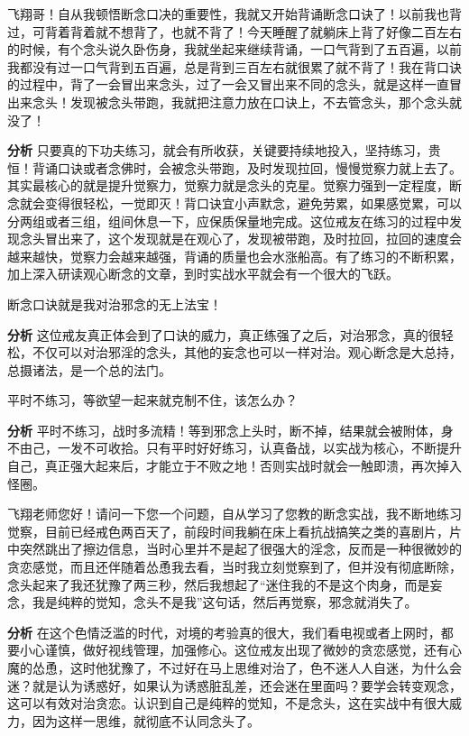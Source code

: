 \begin{case}
    飞翔哥！自从我顿悟断念口决的重要性，我就又开始背诵断念口诀了！以前我也背过，可背着背着就不想背了，也就不背了！今天睡醒了就躺床上背了好像二百左右的时候，有个念头说久卧伤身，我就坐起来继续背诵，一口气背到了五百遍，以前我都没有过一口气背到五百遍，总是背到三百左右就很累了就不背了！我在背口诀的过程中，背了一会冒出来念头，过了一会又冒出来不同的念头，就是这样一直冒出来念头！发现被念头带跑，我就把注意力放在口诀上，不去管念头，那个念头就没了！

    \textbf{分析} 只要真的下功夫练习，就会有所收获，关键要持续地投入，坚持练习，贵恒！背诵口诀或者念佛时，会被念头带跑，及时发现拉回，慢慢觉察力就上去了。其实最核心的就是提升觉察力，觉察力就是念头的克星。觉察力强到一定程度，断念就会变得很轻松，一觉即灭！背口诀宜小声默念，避免劳累，如果感觉累，可以分两组或者三组，组间休息一下，应保质保量地完成。这位戒友在练习的过程中发现念头冒出来了，这个发现就是在观心了，发现被带跑，及时拉回，拉回的速度会越来越快，觉察力会越来越强，背诵的质量也会水涨船高。有了练习的不断积累，加上深入研读观心断念的文章，到时实战水平就会有一个很大的飞跃。
\end{case}

\begin{case}
    断念口诀就是我对治邪念的无上法宝！

    \textbf{分析} 这位戒友真正体会到了口诀的威力，真正练强了之后，对治邪念，真的很轻松，不仅可以对治邪淫的念头，其他的妄念也可以一样对治。观心断念是大总持，总摄诸法，是一个总的法门。
\end{case}

\begin{case}
    平时不练习，等欲望一起来就克制不住，该怎么办？

    \textbf{分析} 平时不练习，战时多流精！等到邪念上头时，断不掉，结果就会被附体，身不由己，一发不可收拾。只有平时好好练习，认真备战，以实战为核心，不断提升自己，真正强大起来后，才能立于不败之地！否则实战时就会一触即溃，再次掉入怪圈。
\end{case}

\begin{case}
    飞翔老师您好！请问一下您一个问题，自从学习了您教的断念实战，我不断地练习觉察，目前已经戒色两百天了，前段时间我躺在床上看抗战搞笑之类的喜剧片，片中突然跳出了擦边信息，当时心里并不是起了很强大的淫念，反而是一种很微妙的贪恋感觉，而且还伴随着怂恿我去看，当时我立刻觉察到了，但并没有彻底断除，念头起来了我还犹豫了两三秒，然后我想起了“迷住我的不是这个肉身，而是妄念，我是纯粹的觉知，念头不是我”这句话，然后再觉察，邪念就消失了。

    \textbf{分析} 在这个色情泛滥的时代，对境的考验真的很大，我们看电视或者上网时，都要小心谨慎，做好视线管理，加强修心。这位戒友出现了微妙的贪恋感觉，还有心魔的怂恿，这时他犹豫了，不过好在马上思维对治了，色不迷人人自迷，为什么会迷？就是认为诱惑好，如果认为诱惑脏乱差，还会迷在里面吗？要学会转变观念，这可以有效对治贪恋。认识到自己是纯粹的觉知，不是念头，这在实战中有很大威力，因为这样一思维，就彻底不认同念头了。
\end{case}

